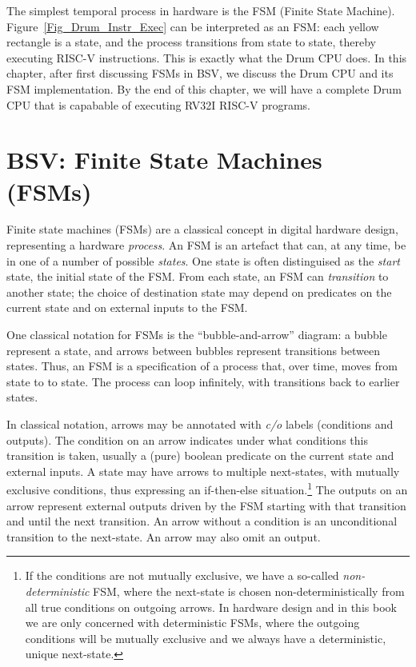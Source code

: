 The simplest temporal process in hardware is the FSM (Finite State
Machine).  Figure~\ref{Fig_Drum_Instr_Exec} can be interpreted as an
FSM: each yellow rectangle is a state, and the process transitions
from state to state, thereby executing RISC-V instructions.  This is
exactly what the Drum CPU does.  In this chapter, after first
discussing FSMs in BSV, we discuss the Drum CPU and its FSM
implementation.  By the end of this chapter, we will have a complete
Drum CPU that is capabable of executing RV32I RISC-V programs.


\section{BSV: Finite State Machines (FSMs)}

\label{Sec_FSMs_FSMs}


Finite state machines (FSMs) are a classical concept in digital
hardware design, representing a hardware \emph{process}.  An FSM is an
artefact that can, at any time, be in one of a number of possible
\emph{states}.  One state is often distinguised as the \emph{start}
state, the initial state of the FSM.  From each state, an FSM can
\emph{transition} to another state; the choice of destination state
may depend on predicates on the current state and on external inputs
to the FSM.

One classical notation for FSMs is the ``bubble-and-arrow'' diagram: a
bubble represent a state, and arrows between bubbles represent
transitions between states.  Thus, an FSM is a specification of a
process that, over time, moves from state to to state.  The process
can loop infinitely, with transitions back to earlier states.

In classical notation, arrows may be annotated with \emph{c/o} labels
(conditions and outputs).  The condition on an arrow indicates under
what conditions this transition is taken, usually a (pure) boolean
predicate on the current state and external inputs.  A state may have
arrows to multiple next-states, with mutually exclusive conditions,
thus expressing an if-then-else situation.\footnote{If the conditions
are not mutually exclusive, we have a so-called
\emph{non-deterministic} FSM, where the next-state is chosen
non-deterministically from all true conditions on outgoing arrows.  In
hardware design and in this book we are only concerned with
deterministic FSMs, where the outgoing conditions will be mutually
exclusive and we always have a deterministic, unique next-state.}  The
outputs on an arrow represent external outputs driven by the FSM
starting with that transition and until the next transition.  An arrow
without a condition is an unconditional transition to the next-state.
An arrow may also omit an output.

